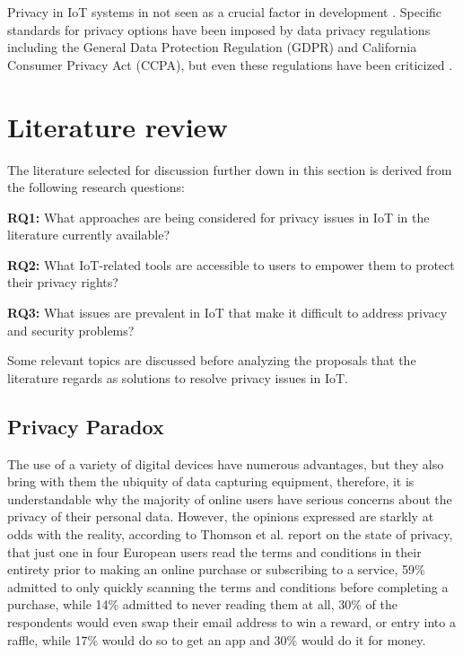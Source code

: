 \documentclass[conference]{IEEEtran}
\begin{document}
Privacy in IoT systems in not seen as a crucial factor in development \cite{alhirabi2021security}.
Specific standards for privacy options have been imposed by data privacy regulations
including the General Data Protection Regulation (GDPR) and California Consumer
Privacy Act (CCPA), but even these regulations have been criticized \cite{peloquin2020disruptive, gladis2022weaponizing, gentile2022deficient, green2022flaws, byun2019privacy}.

\section{Literature review}

The literature selected for discussion further down in this section is derived
from the following research questions:

\textbf{RQ1:} What approaches are being considered for privacy issues in IoT
in the literature currently available?

\textbf{RQ2:} What IoT-related tools are accessible to users to empower them to protect
their privacy rights?

\textbf{RQ3:} What issues are prevalent in IoT that make it difficult to address privacy
and security problems?

Some relevant topics are discussed before analyzing the proposals that the literature
regards as solutions to resolve privacy issues in IoT.

\subsection{Privacy Paradox}

The use of a variety of digital devices have numerous advantages, but they also
bring with them the ubiquity of data capturing equipment, therefore, it is
understandable why the majority of online users have serious concerns about
the privacy of their personal data. However, the opinions expressed are starkly
at odds with the reality, according to Thomson et al. \cite{DarrenState} report
on the state of privacy, that just one in four European users read the terms
and conditions in their entirety prior to making an online purchase or subscribing
to a service, 59\% admitted to only quickly scanning the terms and conditions before
completing a purchase, while 14\% admitted to never reading them at all, 30\% of
the respondents would even swap their email address to win a reward, or entry
into a raffle, while 17\% would do so to get an app and 30\% would do it for money.
\end{document}
